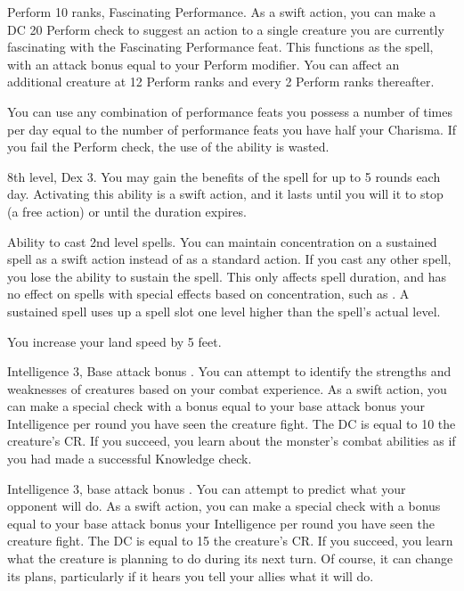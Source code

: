 \featpre Perform 10 ranks, Fascinating Performance.
\featben As a swift action, you can make a DC 20 Perform check to suggest an action to a single creature you are currently fascinating with the Fascinating Performance feat. This functions as the  spell, with an attack bonus equal to your Perform modifier. You can affect an additional creature at 12 Perform ranks and every 2 Perform ranks thereafter.

You can use any combination of performance feats you possess a number of times per day equal to the number of performance feats you have \add half your Charisma. If you fail the Perform check, the use of the ability is wasted.

\featpre 8th level, Dex 3.
\featben You may gain the benefits of the  spell for up to 5 rounds each day. Activating this ability is a swift action, and it lasts until you will it to stop (a free action) or until the duration expires.

\featpre Ability to cast 2nd level spells.
\featben You can maintain concentration on a sustained spell as a swift action instead of as a standard action. If you cast any other spell, you lose the ability to sustain the spell. This only affects spell duration, and has no effect on spells with special effects based on concentration, such as . A sustained spell uses up a spell slot one level higher than the spell's actual level.

 You increase your land speed by 5 feet.

 Intelligence 3, Base attack bonus .
 You can attempt to identify the strengths and weaknesses of creatures based on your combat experience. As a swift action, you can make a special check with a bonus equal to your base attack bonus \add your Intelligence  per round you have seen the creature fight. The DC is equal to 10 \add the creature's CR. If you succeed, you learn about the monster's combat abilities as if you had made a successful Knowledge check.

 Intelligence 3, base attack bonus .
 You can attempt to predict what your opponent will do. As a swift action, you can make a special check with a bonus equal to your base attack bonus \add your Intelligence  per round you have seen the creature fight. The DC is equal to 15 \add the creature's CR. If you succeed, you learn what the creature is planning to do during its next turn. Of course, it can change its plans, particularly if it hears you tell your allies what it will do.

